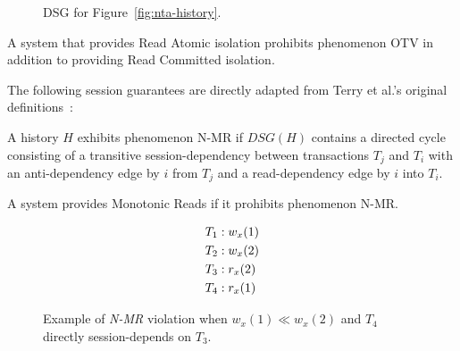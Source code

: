 \begin{figure}[H]
\centering
{}
\caption{DSG for Figure~\ref{fig:nta-history}.}
\label{fig:nta-dsg}
\end{figure}

\begin{definition}
A system that provides Read Atomic isolation prohibits phenomenon
OTV in addition to providing Read Committed isolation.
\end{definition}

The following session guarantees are directly adapted from Terry et
al.'s original definitions~\cite{sessionguarantees}:

\begin{definition}
A history $H$ exhibits phenomenon N-MR if $DSG(H)$ contains a directed cycle
consisting of a transitive session-dependency between transactions
$T_j$ and $T_i$ with an anti-dependency edge by $i$ from $T_j$ and a
read-dependency edge by $i$ into $T_i$.
\end{definition}

\begin{definition}
A system provides Monotonic Reads if it prohibits phenomenon N-MR.
\end{definition}


\begin{figure}[H]
\begin{align*}
\small
T_1 &: w_x(1)\\
T_2 &: w_x(2)\\
T_3 &: r_x(2)\\
T_4 &: r_x(1)
\end{align*}
\caption{Example of \textit{N-MR} violation when $w_x(1) \ll w_x(2)$ and $T_4$ directly session-depends on $T_3$.}
\label{fig:nmr-history}
\end{figure}

